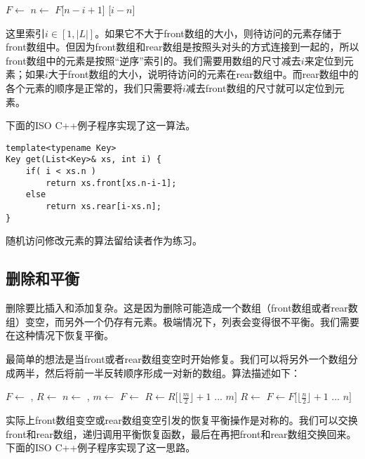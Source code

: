 \documentclass[UTF8]{article}
\begin{document}
\begin{algorithmic}
  \State $F \gets $ 
  \State $n \gets $ 
    \State \Return $F$[$n-i+1$]
  \Else
    \State \Return {}[$i-n$]
  \EndIf
\EndFunction
\end{algorithmic}

这里索引$i \in [1, |L|]$。如果它不大于front数组的大小，则待访问的元素存储于front数组中。但因为front数组和rear数组是按照头对头的方式连接到一起的，所以front数组中的元素是按照“逆序”索引的。我们需要用数组的尺寸减去$i$来定位到元素；如果$i$大于front数组的大小，说明待访问的元素在rear数组中。而rear数组中的各个元素的顺序是正常的，我们只需要将$i$减去front数组的尺寸就可以定位到元素。

下面的ISO C++例子程序实现了这一算法。

\begin{lstlisting}
template<typename Key>
Key get(List<Key>& xs, int i) {
    if( i < xs.n )
        return xs.front[xs.n-i-1];
    else
        return xs.rear[i-xs.n];
}
\end{lstlisting}

随机访问修改元素的算法留给读者作为练习。

\subsection{删除和平衡}
删除要比插入和添加复杂。这是因为删除可能造成一个数组（front数组或者rear数组）变空，而另外一个仍存有元素。极端情况下，列表会变得很不平衡。我们需要在这种情况下恢复平衡。

最简单的想法是当front或者rear数组变空时开始修复。我们可以将另外一个数组分成两半，然后将前一半反转顺序形成一对新的数组。算法描述如下：

\begin{algorithmic}
  \State $F \gets$ , $R \gets$ 
  \State $n \gets$ , $m \gets$ 
    \State $F \gets$ 
    \State $R \gets R[\lfloor \frac{m}{2} \rfloor + 1$ ... $m]$
    \State $R \gets$ 
    \State $F \gets F[\lfloor \frac{n}{2} \rfloor + 1$ ... $n]$
  \EndIf
\EndFunction
\end{algorithmic}

实际上front数组变空或rear数组变空引发的恢复平衡操作是对称的。我们可以交换front和rear数组，递归调用平衡恢复函数，最后在再把front和rear数组交换回来。下面的ISO C++例子程序实现了这一思路。
\end{document}
